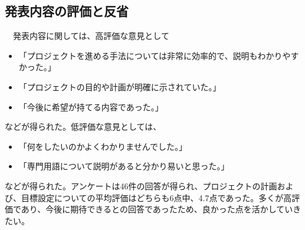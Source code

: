 \subsection{発表内容の評価と反省}
　発表内容に関しては、高評価な意見として
\begin{itemize}
    \item 「プロジェクトを進める手法については非常に効率的で、説明もわかりやすかった。」
    \item 「プロジェクトの目的や計画が明確に示されていた。」
    \item 「今後に希望が持てる内容であった。」
\end{itemize}
などが得られた。低評価な意見としては、
\begin{itemize}
    \item 「何をしたいのかよくわかりませんでした。」
    \item 「専門用語について説明があると分かり易いと思った。」
\end{itemize}
などが得られた。アンケートは46件の回答が得られ、プロジェクトの計画および、目標設定についての平均評価はどちらも6点中、4.7点であった。多くが高評価であり、今後に期待できるとの回答であったため、良かった点を活かしていきたい。
